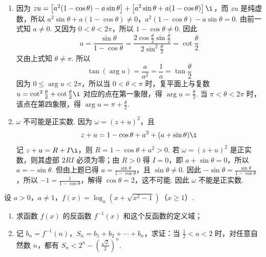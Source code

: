 \documentclass[UTF8,a4paper,oneside,11pt]{ctexbook}
\begin{document}
\begin{solution}
\begin{enumerate}
\item 因为 \(zu=\left[a^2(1-\cos\theta)-a\sin\theta\right]+\left[a^2\sin\theta+a(1-\cos\theta)\right]\i\)，而 \(zu\) 是纯虚数，所以 \(a^2\sin\theta+a(1-\cos\theta)\neq0\)，\(a^2(1-\cos\theta)-a\sin\theta=0\). 由前一式知 \(a\neq0\). 又因为 \(0<\theta<2\pi\)，所以 \(1-\cos\theta\neq0\). 因此
\[
a=\frac{\sin\theta}{1-\cos\theta}=\frac{2\cos\frac{\theta}{2}\sin\frac{\theta}{2}}{2\sin^2\frac{\theta}{2}}=\cot\frac{\theta}{2}
\]
又由上式知 \(\theta\neq\pi\). 所以
\[
\tan(\arg u)=\frac{a}{a^2}=\frac{1}{a}=\tan\frac{\theta}{2}
\]
因为 \(0\leqslant\arg u<2\pi\)，所以当 \(0<\theta<\pi\) 时，复平面上与复数 \(u=\cot^2\frac{\theta}{2}+\cot\frac{\theta}{2}\i\) 对应的点在第一象限，得 \(\arg u=\frac{\theta}{2}\). 当 \(\pi<\theta<2\pi\) 时，该点在第四象限，得 \(\arg u=\pi+\frac{\theta}{2}\).

\item \(\omega\) 不可能是正实数. 因为 \(\omega=(z+u)^2\)，且
\[
z+u=1-\cos\theta+a^2+(a+\sin\theta)\i
\]
记 \(z+u=R+I\i\)，则 \(R=1-\cos\theta+a^2>0\). 若 \(\omega=(z+u)^2\) 是正实数，则其虚部 \(2RI\) 必须为零；由 \(R>0\) 得 \(I=0\)，即 \(a+\sin\theta=0\)，所以 \(a=-\sin\theta\). 但由上题已得 \(a=\frac{\sin\theta}{1-\cos\theta}\)，且 \(\sin\theta\neq0\). 因此 \(-\sin\theta=\frac{\sin\theta}{1-\cos\theta}\)，所以 \(-1=\frac{1}{1-\cos\theta}\)，解得 \(\cos\theta=2\)，这不可能. 因此 \(\omega\) 不能是正实数.
\end{enumerate}
\end{solution}

\begin{problem}
设 \(a > 0\)，\(a \neq 1\)，\(f(x) = \log_a\left(x + \sqrt{x^2 - 1}\right)\)（\(x \geqslant 1\)）.
\begin{enumerate}
\item 求函数 \(f(x)\) 的反函数 \(f^{-1}(x)\) 和这个反函数的定义域；
\item 记 \(b_n = f^{-1}(n)\)，\(S_n = b_1 + b_2 + \cdots + b_n\)，求证：当 \(\frac{1}{2} < a < 2\) 时，对任意自然数 \(n\)，都有 \(S_n < 2^n - \left(\frac{\sqrt{2}}{2}\right)^n\).
\end{enumerate}
\end{problem}
\end{document}
